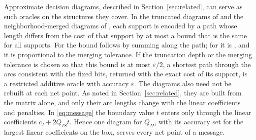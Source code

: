 Approximate decision diagrams, described in Section~\ref{sec:related},
can serve as such oracles on the structures they cover. In the truncated
diagrams of \cite{GomezBanded} and the neighborhood-merged diagrams of
\cite{ChoiDiagrams}, each support is encoded by a path whose length
differs from the cost of that support by at most a bound that is the
same for all supports. For \cite{GomezBanded} the bound follows by
summing \cite[Proposition~7]{GomezBanded} along the path; for
\cite{ChoiDiagrams} it is \cite[Proposition~9]{ChoiDiagrams}, and it is
proportional to the merging tolerance. If the truncation depth or the
merging tolerance is chosen so that this bound is at most
$\varepsilon/2$, a shortest path through the arcs consistent with the
fixed bits, returned with the exact cost of its support, is a restricted
additive oracle with accuracy $\varepsilon$. The diagrams also need not
be rebuilt at each net point. As noted in Section~\ref{sec:related},
they are built from the matrix alone, and only their arc lengths change
with the linear coefficients and penalties. In \eqref{eq:message} the
boundary value $t$ enters only through the linear coefficients
$c_I+2Q_{IS}t$. Hence one diagram for $Q_{II}$, with its accuracy set for
the largest linear coefficients on the box, serves every net point of a
message.

